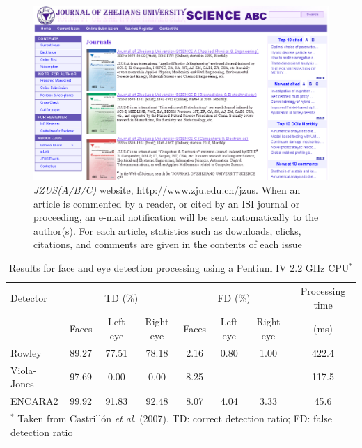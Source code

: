 \documentclass[twoside,twocolumn]{article}
\begin{document}
\begin{figure}[tbh!]
\centering
\includegraphics{pics/website.eps}
\caption{\emph{JZUS(A/B/C)} website, http://www.zju.edu.cn/jzus. When an article is commented by a reader, or cited by an ISI journal or proceeding, an e-mail notification will be sent automatically to the author(s). For each article, statistics such as downloads, clicks, citations, and comments are given in the contents of each issue} \label{fig:website}
\end{figure}


\begin{table}[thp]\footnotesize
\centering \caption{Results for face and eye detection processing
using a Pentium IV 2.2 GHz
CPU$^\textbf{*}$}\label{Table:FacesDetected}
\begin{tabular*}{15cm}{@{\extracolsep{\fill}}lccccccc}
\toprule[0.75pt]
Detector & \multicolumn{3}{c}{TD (\%)} & \multicolumn{3}{c}{FD (\%)} & \multicolumn{1}{c}{Processing time} \\
\cmidrule[0.5pt]{2-4}\cmidrule[0.5pt]{5-7}
& Faces & Left eye & Right eye & Faces & Left eye & Right eye & (ms) \\
\midrule[0.5pt]
Rowley  & 89.27 & 77.51   &  78.18  &  2.16 & 0.80 & 1.00 & 422.4 \\
Viola-Jones  & 97.69 & 0.00  &  0.00  & 8.25  &  &  & 117.5 \\
ENCARA2  &  99.92 & 91.83 &  92.48 &  8.07  &  4.04 & 3.33 &45.6\\
\bottomrule[0.75pt] \multicolumn{8}{l}{\scriptsize {}$^*$ Taken
from Castrill\'{o}n \emph{et al}. (2007). TD: correct detection
ratio; FD: false detection ratio}
\end{tabular*}
\end{table}
\end{document}
